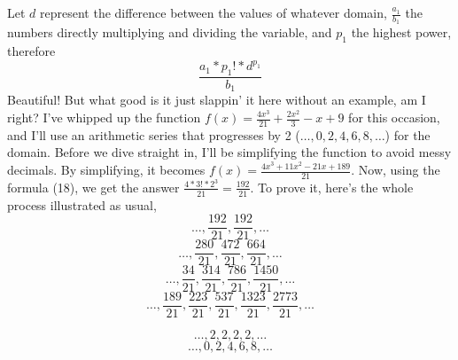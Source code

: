 \documentclass[12pt, letterpaper]{report}
\begin{document}
\noindent
Let $d$ represent the difference between the values of whatever domain, $\frac{a_{1}}{b_{1}}$ the numbers directly multiplying and dividing the variable, and $p_{1}$ the highest power, therefore
\begin{equation}\frac{a_{1}*p_{1}!*d^{p_{1}}}{b_{1}}\end{equation}
Beautiful! But what good is it just slappin' it here without an example, am I right? I've whipped up the function $f(x)=\frac{4x^3}{21}+\frac{2x^2}{3}-x+9$ for this occasion, and I'll use an arithmetic series that progresses by 2 ($\dots, 0, 2, 4, 6, 8, \dots$) for the domain. Before we dive straight in, I'll be simplifying the function to avoid messy decimals. By simplifying,  it becomes $f(x)=\frac{4x^3+11x^2-21x+189}{21}$. Now, using the formula (18), we get the answer $\frac{4*3!*2^3}{21}=\frac{192}{21}$. To prove it, here's the whole process illustrated as usual,
$$\dots, \frac{192}{21}, \frac{192}{21}, \dots$$
$$\dots, \frac{280}{21}, \frac{472}{21}, \frac{664}{21}, \dots$$
$$\dots, \frac{34}{21}, \frac{314}{21}, \frac{786}{21}, \frac{1450}{21}, \dots$$
\begin{equation}\dots, \frac{189}{21}, \frac{223}{21}, \frac{537}{21}, \frac{1323}{21}, \frac{2773}{21}, \dots\end{equation}

$$\dots, 2, 2, 2, 2, \dots$$
\begin{equation}\dots, 0, 2, 4, 6, 8, \dots\end{equation}
\end{document}
